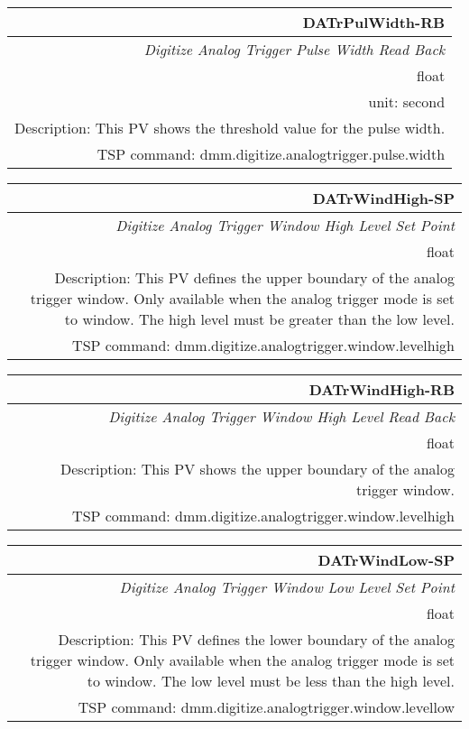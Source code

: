 \documentclass[openany]{article}
\begin{document}
		\begin{tabular}{N}
			\hline
			\bfseries DATrPulWidth-RB\label{pv:datrpulwidth-rb} \\ \hline
			\emph{Digitize Analog Trigger Pulse Width Read Back} \\
			float \\
			unit: second \\
			Description: This PV shows the threshold value for the pulse width. \\
			TSP command: dmm.digitize.analogtrigger.pulse.width
		\end{tabular}

		\begin{tabular}{N}
			\hline
			\bfseries DATrWindHigh-SP\label{pv:datrwindhigh-sp} \\ \hline
			\emph{Digitize Analog Trigger Window High Level Set Point} \\
			float \\
			Description: This PV defines the upper boundary of the analog trigger window. Only available when the analog trigger mode is set to window. The high level must be greater than the low level. \\
			TSP command: dmm.digitize.analogtrigger.window.levelhigh
		\end{tabular}

		\begin{tabular}{N}
			\hline
			\bfseries DATrWindHigh-RB\label{pv:datrwindhigh-rb} \\ \hline
			\emph{Digitize Analog Trigger Window High Level Read Back} \\
			float \\
			Description: This PV shows the upper boundary of the analog trigger window. \\
			TSP command: dmm.digitize.analogtrigger.window.levelhigh
		\end{tabular}

		\begin{tabular}{N}
			\hline
			\bfseries DATrWindLow-SP\label{pv:datrwindlow-sp} \\ \hline
			\emph{Digitize Analog Trigger Window Low Level Set Point} \\
			float \\
			Description: This PV defines the lower boundary of the analog trigger window. Only available when the analog trigger mode is set to window. The low level must be less than the high level. \\
			TSP command: dmm.digitize.analogtrigger.window.levellow
		\end{tabular}
\end{document}
